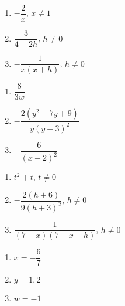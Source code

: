 \documentclass{ximera}
\begin{document}
\begin{multicols}{3}
\begin{enumerate}
\setcounter{enumi}{\value{HW}}

\item $-\dfrac{2}{x}$, $x \neq 1$
\item $\dfrac{3}{4-2h}$, $h \neq 0$
\item $-\dfrac{1}{x(x+h)}$, $h \neq 0$

\setcounter{HW}{\value{enumi}}
\end{enumerate}
\end{multicols}


\begin{multicols}{3}
\begin{enumerate}
\setcounter{enumi}{\value{HW}}

\item  $\dfrac{8}{3w}$
\item  $-\dfrac{2(y^2-7y+9)}{y(y-3)^2}$
\item  $-\dfrac{6}{(x-2)^2}$

 
\setcounter{HW}{\value{enumi}}
\end{enumerate}
\end{multicols}

\begin{multicols}{3}
\begin{enumerate}
\setcounter{enumi}{\value{HW}}

\item $t^2+t$, $t \neq 0$  
\item $-\dfrac{2(h+6)}{9(h+3)^2}$, $h \neq 0$ 
\item $\dfrac{1}{(7-x)(7-x-h)}$, $h \neq 0$ 

\setcounter{HW}{\value{enumi}}
\end{enumerate}
\end{multicols}



\begin{multicols}{3}
\begin{enumerate}
\setcounter{enumi}{\value{HW}}

\item $x = -\dfrac{6}{7}$
\item $y = 1, 2$ 
\item $w = -1$ 

\setcounter{HW}{\value{enumi}}
\end{enumerate}
\end{multicols}
\end{document}
